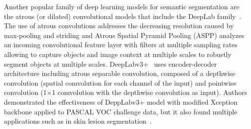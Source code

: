 Another popular family of deep learning models for semantic segmentation are the atrous (or dilated) convolutional models that include the DeepLab family~\cite{chen2017deeplab, chen2017rethinking}. The use of atrous convolutions addresses the decreasing resolution caused by max-pooling and striding and Atrous Spatial Pyramid Pooling (ASPP) analyzes an incoming convolutional feature layer with filters at multiple sampling rates allowing to capture objects and image context at multiple scales to robustly segment objects at multiple scales. DeepLabv3+~\cite{chen2018encoder} uses encoder-decoder architecture including atrous separable convolution, composed of a depthwise convolution (spatial comvolution for each channel of the input) and pointwise convolution (1$\times$1 comvolution with the depthwise convolution as input). Authors demonstrated the effectiveness of DeppLabv3+ model with modified Xception backbone applied to PASCAL VOC challenge data, but it also found multiple applications such as in skin lesion segmentation~\cite{azad2020attention}. 

